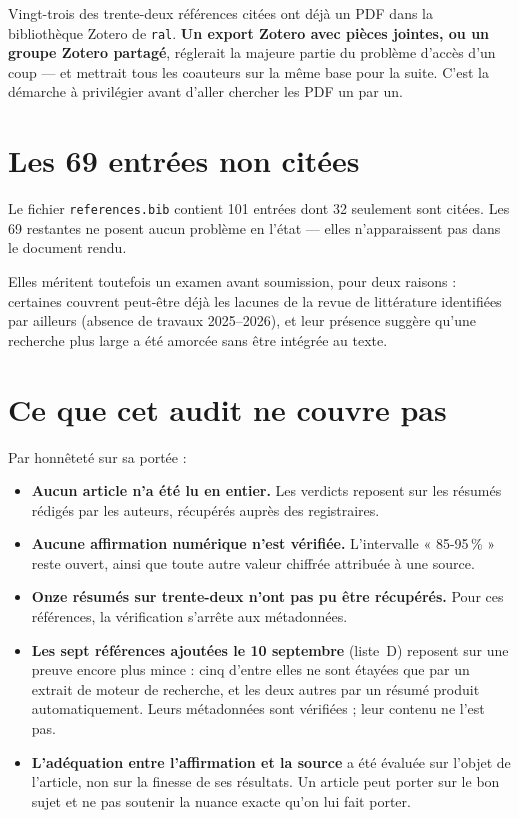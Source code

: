 \documentclass[11pt,a4paper]{article}
\newcommand{\cle}[1]{\texttt{\small #1}}
\begin{document}
Vingt-trois des trente-deux références citées ont déjà un PDF dans la
bibliothèque Zotero de \cle{ral}. \textbf{Un export Zotero avec pièces jointes,
ou un groupe Zotero partagé}, réglerait la majeure partie du problème d'accès
d'un coup --- et mettrait tous les coauteurs sur la même base pour la suite.
C'est la démarche à privilégier avant d'aller chercher les PDF un par un.

\section{Les 69 entrées non citées}

Le fichier \cle{references.bib} contient 101 entrées dont 32 seulement sont
citées. Les 69 restantes ne posent aucun problème en l'état --- elles
n'apparaissent pas dans le document rendu.

Elles méritent toutefois un examen avant soumission, pour deux raisons :
certaines couvrent peut-être déjà les lacunes de la revue de littérature
identifiées par ailleurs (absence de travaux 2025--2026), et leur présence
suggère qu'une recherche plus large a été amorcée sans être intégrée au texte.

\section{Ce que cet audit ne couvre pas}

Par honnêteté sur sa portée :

\begin{itemize}
\item \textbf{Aucun article n'a été lu en entier.} Les verdicts reposent sur les
résumés rédigés par les auteurs, récupérés auprès des registraires.
\item \textbf{Aucune affirmation numérique n'est vérifiée.} L'intervalle
« 85-95\,\% » reste ouvert, ainsi que toute autre valeur chiffrée attribuée à
une source.
\item \textbf{Onze résumés sur trente-deux n'ont pas pu être récupérés.} Pour
ces références, la vérification s'arrête aux métadonnées.
\item \textbf{Les sept références ajoutées le 10 septembre}
(liste~D) reposent sur une preuve encore plus mince : cinq d'entre elles ne sont
étayées que par un extrait de moteur de recherche, et les deux autres par un
résumé produit automatiquement. Leurs métadonnées sont vérifiées ; leur contenu
ne l'est pas.
\item \textbf{L'adéquation entre l'affirmation et la source} a été évaluée sur
l'objet de l'article, non sur la finesse de ses résultats. Un article peut
porter sur le bon sujet et ne pas soutenir la nuance exacte qu'on lui fait
porter.
\end{itemize}
\end{document}
